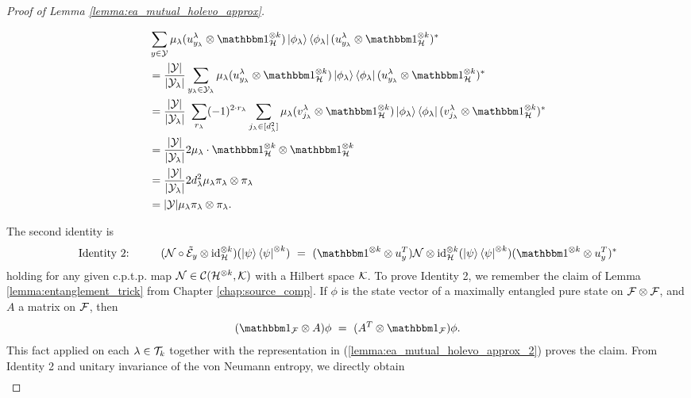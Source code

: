 \begin{proof}[Proof of Lemma \ref{lemma:ea_mutual_holevo_approx}]
\begin{itemize}
\begin{align*}
     & \sum_{y \in \cY}
     \mu_\lambda (u_{y_\lambda}^\lambda \otimes \bbmeins_{\cH}^{\otimes k})\ket{\phi_\lambda}\bra{\phi_\lambda}(u_{y_\lambda}^\lambda \otimes \bbmeins_{\cH}^{\otimes k})^\ast  \\
     &= \frac{|\cY|}{|\cY_\lambda|}\sum_{y_\lambda \in \cY_\lambda}
     \mu_\lambda (u_{y_\lambda}^\lambda \otimes \bbmeins_{\cH}^{\otimes k})\ket{\phi_\lambda}\bra{\phi_\lambda}(u_{y_\lambda}^\lambda \otimes \bbmeins_{\cH}^{\otimes k})^\ast  \\
     & = \frac{|\cY|}{|\cY_\lambda|}  \ \sum_{r_\lambda} (-1)^{2 \cdot r_\lambda} \sum_{j_\lambda \in [d_\lambda^2]} 
     \mu_\lambda (v_{j_\lambda}^\lambda \otimes \bbmeins_{\cH}^{\otimes k})\ket{\phi_\lambda}\bra{\phi_\lambda}(v_{j_\lambda}^\lambda \otimes \bbmeins_{\cH}^{\otimes k})^\ast \\
     & = \frac{|\cY|}{|\cY_\lambda|}2 \mu_\lambda \cdot \bbmeins_{\cH}^{\otimes k} \otimes \bbmeins_{\cH}^{\otimes k} \\
     & = \frac{|\cY|}{|\cY_\lambda|}2 d_\lambda^2 \mu_\lambda \pi_\lambda \otimes \pi_\lambda \\
     & = |\cY| \mu_\lambda \pi_\lambda \otimes \pi_\lambda.
    \end{align*} 
  \end{itemize} 
The second identity is
\begin{align*}
    \text{Identity 2:} \hspace{1cm} (\cN \circ \tilde{\cE}_y \otimes \id_{\cH}^{\otimes k})(\ket{\psi}\bra{\psi}^{\otimes k})  \ 
  = \ (\bbmeins^{\otimes k} \otimes u_y^T)\cN \otimes \id_{\cH}^{\otimes k}(\ket{\psi}\bra{\psi}^{\otimes k})(\bbmeins^{\otimes k} \otimes u_y^T)^\ast
\end{align*}
holding for any given c.p.t.p. map ${\mathcal N} \in {\mathcal C}({\mathcal H}^{\otimes k}, {\mathcal K})$ with a Hilbert space ${\mathcal K}$. To prove Identity 2, we remember the claim of Lemma \ref{lemma:entanglement_trick} from Chapter \ref{chap:source_comp}. If $\phi$ is the state vector of a maximally entangled pure state on ${\mathcal F} \otimes {\mathcal F}$, and $A$ a matrix on ${\mathcal F}$, then
\begin{align*}
(\bbmeins_{\cF} \otimes A)\phi \ = \ (A^T \otimes \bbmeins_{\cF})\phi.
\end{align*}
This fact applied on each $\lambda \in {\mathcal T}_k$ together with the representation in (\ref{lemma:ea_mutual_holevo_approx_2}) proves the claim. \newline 
From Identity 2 and unitary invariance of the von Neumann entropy, we directly obtain 
\begin{align}

\end{align}
\end{proof}
